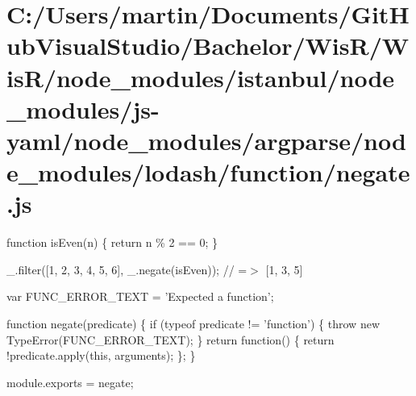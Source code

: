 \hypertarget{_c_1_2_users_2martin_2_documents_2_git_hub_visual_studio_2_bachelor_2_wis_r_2_wis_r_2node_module601daaf29438cdaa981ad2ec4661fb94}{}\section{C\+:/\+Users/martin/\+Documents/\+Git\+Hub\+Visual\+Studio/\+Bachelor/\+Wis\+R/\+Wis\+R/node\+\_\+modules/istanbul/node\+\_\+modules/js-\/yaml/node\+\_\+modules/argparse/node\+\_\+modules/lodash/function/negate.\+js}
function is\+Even(n) \{ return n \% 2 == 0; \}

\+\_\+.\+filter(\mbox{[}1, 2, 3, 4, 5, 6\mbox{]}, \+\_\+.\+negate(is\+Even)); // =$>$ \mbox{[}1, 3, 5\mbox{]}


\begin{DoxyCodeInclude}

var FUNC\_ERROR\_TEXT = \textcolor{stringliteral}{'Expected a function'};

\textcolor{keyword}{function} negate(predicate) \{
  \textcolor{keywordflow}{if} (typeof predicate != \textcolor{stringliteral}{'function'}) \{
    \textcolor{keywordflow}{throw} \textcolor{keyword}{new} TypeError(FUNC\_ERROR\_TEXT);
  \}
  \textcolor{keywordflow}{return} \textcolor{keyword}{function}() \{
    \textcolor{keywordflow}{return} !predicate.apply(\textcolor{keyword}{this}, arguments);
  \};
\}

module.exports = negate;
\end{DoxyCodeInclude}
 